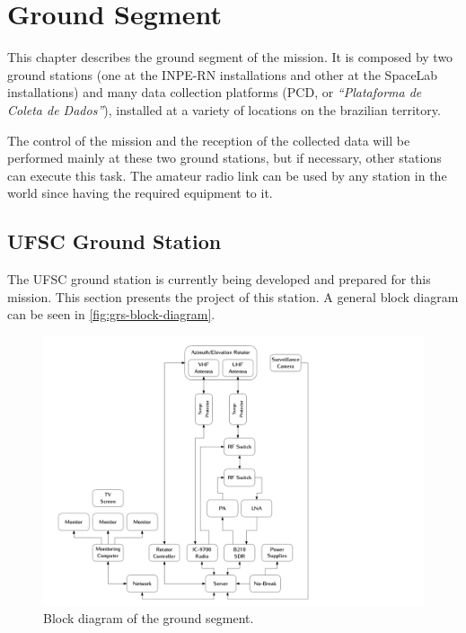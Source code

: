%
%
%
%
%

%
%
%
%
%

\chapter{Ground Segment} \label{ch:ground-segment}

This chapter describes the ground segment of the mission. It is composed by two ground stations (one at the INPE-RN installations and other at the SpaceLab installations) and many data collection platforms (PCD, or \textit{``Plataforma de Coleta de Dados''}), installed at a variety of locations on the brazilian territory.

The control of the mission and the reception of the collected data will be performed mainly at these two ground stations, but if necessary, other stations can execute this task. The amateur radio link can be used by any station in the world since having the required equipment to it.

\section{UFSC Ground Station}

The UFSC ground station is currently being developed and prepared for this mission. This section presents the project of this station. A general block diagram can be seen in \autoref{fig:grs-block-diagram}.

\begin{figure}[!ht]
    \begin{center}
        \includegraphics[width=\textwidth]{figures/grs-block-diagram.pdf}
        \caption{Block diagram of the ground segment.}
        \label{fig:grs-block-diagram}
    \end{center}
\end{figure}

